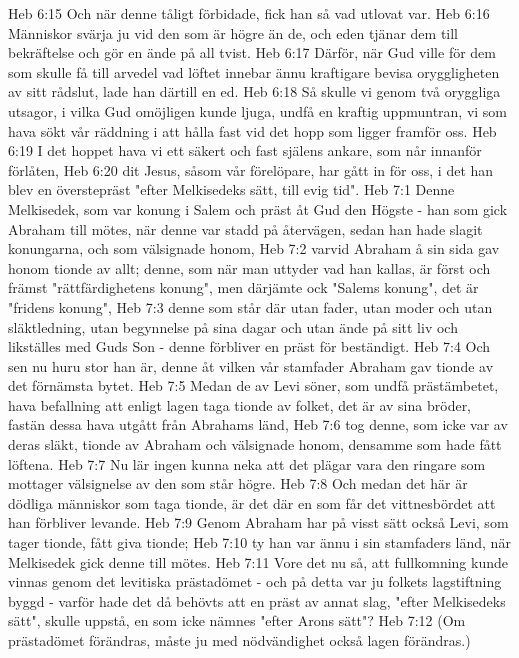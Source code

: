 Heb 6:15  Och när denne tåligt förbidade, fick han så vad utlovat var.
Heb 6:16  Människor svärja ju vid den som är högre än de, och eden tjänar dem till bekräftelse och gör en ände på all tvist.
Heb 6:17  Därför, när Gud ville för dem som skulle få till arvedel vad löftet innebar ännu kraftigare bevisa oryggligheten av sitt rådslut, lade han därtill en ed.
Heb 6:18  Så skulle vi genom två oryggliga utsagor, i vilka Gud omöjligen kunde ljuga, undfå en kraftig uppmuntran, vi som hava sökt vår räddning i att hålla fast vid det hopp som ligger framför oss.
Heb 6:19  I det hoppet hava vi ett säkert och fast själens ankare, som når innanför förlåten,
Heb 6:20  dit Jesus, såsom vår förelöpare, har gått in för oss, i det han blev en överstepräst "efter Melkisedeks sätt, till evig tid".
Heb 7:1  Denne Melkisedek, som var konung i Salem och präst åt Gud den Högste - han som gick Abraham till mötes, när denne var stadd på återvägen, sedan han hade slagit konungarna, och som välsignade honom,
Heb 7:2  varvid Abraham å sin sida gav honom tionde av allt; denne, som när man uttyder vad han kallas, är först och främst "rättfärdighetens konung", men därjämte ock "Salems konung", det är "fridens konung",
Heb 7:3  denne som står där utan fader, utan moder och utan släktledning, utan begynnelse på sina dagar och utan ände på sitt liv och likställes med Guds Son - denne förbliver en präst för beständigt.
Heb 7:4  Och sen nu huru stor han är, denne åt vilken vår stamfader Abraham gav tionde av det förnämsta bytet.
Heb 7:5  Medan de av Levi söner, som undfå prästämbetet, hava befallning att enligt lagen taga tionde av folket, det är av sina bröder, fastän dessa hava utgått från Abrahams länd,
Heb 7:6  tog denne, som icke var av deras släkt, tionde av Abraham och välsignade honom, densamme som hade fått löftena.
Heb 7:7  Nu lär ingen kunna neka att det plägar vara den ringare som mottager välsignelse av den som står högre.
Heb 7:8  Och medan det här är dödliga människor som taga tionde, är det där en som får det vittnesbördet att han förbliver levande.
Heb 7:9  Genom Abraham har på visst sätt också Levi, som tager tionde, fått giva tionde;
Heb 7:10  ty han var ännu i sin stamfaders länd, när Melkisedek gick denne till mötes.
Heb 7:11  Vore det nu så, att fullkomning kunde vinnas genom det levitiska prästadömet - och på detta var ju folkets lagstiftning byggd - varför hade det då behövts att en präst av annat slag, "efter Melkisedeks sätt", skulle uppstå, en som icke nämnes "efter Arons sätt"?
Heb 7:12  (Om prästadömet förändras, måste ju med nödvändighet också lagen förändras.)
